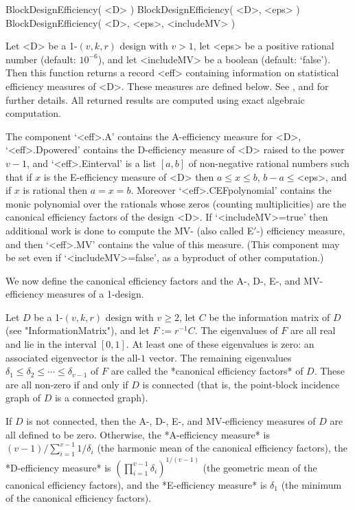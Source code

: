 
\>BlockDesignEfficiency( <D> )
\>BlockDesignEfficiency( <D>, <eps> )
\>BlockDesignEfficiency( <D>, <eps>, <includeMV> )

Let <D> be a 1-$(v,k,r)$ design with $v>1$, let <eps> be a positive
rational number (default: $10^{-6}$), and let <includeMV> be a boolean
(default: `false').  Then this function returns a record <eff> containing
information on statistical efficiency measures of <D>. These measures
are defined below.  See \cite{Extrep}, \cite{BaCa} and \cite{BaRo}
for further details.  All returned results are computed using exact
algebraic computation.

The component `<eff>.A' contains the A-efficiency measure for <D>,
`<eff>.Dpowered' contains the D-efficiency measure of <D> raised to the
power $v-1$, and `<eff>.Einterval' is a list $[a,b]$ of non-negative
rational numbers such that if $x$ is the E-efficiency measure of <D>
then $a\le x\le b$, $b-a\le$<eps>, and if $x$ is rational then $a=x=b$.
Moreover `<eff>.CEFpolynomial' contains the monic polynomial over the
rationals whose zeros (counting multiplicities) are the canonical
efficiency factors of the design <D>.  If `<includeMV>=true' then
additional work is done to compute the MV- (also called E$'$-) efficiency
measure, and then `<eff>.MV' contains the value of this measure. (This
component may be set even if `<includeMV>=false', as a byproduct of
other computation.)

We now define the canonical efficiency factors and the A-, D-, E-,
and MV-efficiency measures of a 1-design. 

Let $D$ be a 1-$(v,k,r)$ design with $v\ge 2$, let $C$ be the information
matrix of $D$ (see "InformationMatrix"), and let $F:=r^{-1}C$.
The eigenvalues of $F$ are all real and lie in the interval $[0,1]$.
At least one of these eigenvalues is zero: an associated eigenvector is
the all-$1$ vector. The remaining eigenvalues $\delta_1\le \delta_2\le
\cdots \le \delta_{v-1}$ of $F$ are called the *canonical efficiency
factors* of $D$. These are all non-zero if and only if $D$ is connected
(that is, the point-block incidence graph of $D$ is a connected graph).

If $D$ is not connected, then the A-, D-, E-, and MV-efficiency measures
of $D$ are all defined to be zero.  Otherwise, the *A-efficiency
measure* is $(v-1)/\sum_{i=1}^{v-1}1/\delta_i$ (the harmonic mean
of the canonical efficiency factors), the *D-efficiency measure*
is $(\prod_{i=1}^{v-1}\delta_i)^{1/(v-1)}$ (the geometric mean of
the canonical efficiency factors), and the *E-efficiency measure* is
$\delta_1$ (the minimum of the canonical efficiency factors).

